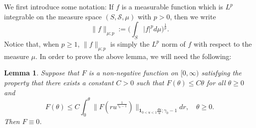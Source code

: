 \documentclass[12pt, a4paper]{amsart}
\newtheorem{lem}[thm]{Lemma}
\theoremstyle{definition}
\numberwithin{equation}{section}
\begin{document}
	We first introduce some notation:
	If $f$ is a measurable function which is $L^p$ integrable on the 
	measure space
	$(S,\mathscr S,\mu)$ with $p > 0$, then we write
\[
	\|f\|_{\mu;p} := \Big(\int_{S} |f|^p d\mu \Big)^{\frac{1}{p}}.
\]
	Notice that, when $p\geq 1$, $\|f\|_{\mu;p}$ is simply the $L^p$ norm of $f$ with respect to the measure $\mu$.	
	In order to prove the above lemma, we will need the following:

\begin{lem}\label{lem: F is zero}
	Suppose that $F$ is a non-negative function on $[0,\infty)$ satisfying the property that there exists a constant $C>0$ such that  $F(\theta) \leq C\theta$ for all $\theta \geq 0$ and
\[
	F(\theta)
	\leq C \int_0^\theta \|  F(ru^{ \frac{1}{\gamma_0- 1}  })\|_{\mathbf 1_{0<u<1}\frac{du}{u}; \gamma_0 - 1} dr, \quad \theta \geq 0.
\]
	Then $F \equiv 0$.
\end{lem}
	
\end{document}
